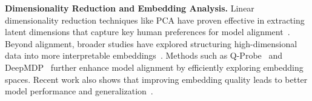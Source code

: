 
\noindent\textbf{Dimensionality Reduction and Embedding Analysis.}
Linear dimensionality reduction techniques like PCA have proven effective in extracting latent dimensions that capture key human preferences for model alignment~\citep{freire2024uncovering}. Beyond alignment, broader studies have explored structuring high-dimensional data into more interpretable embeddings~\cite {huertas2023exploring,kanerva2000random}. Methods such as Q-Probe~\citep{li2024q} and DeepMDP~\citep{gelada2019deepmdp} further enhance model alignment by efficiently exploring embedding spaces. Recent work also shows that improving embedding quality leads to better model performance and generalization~\citep{li2024reward,yang2024regularizing}.



